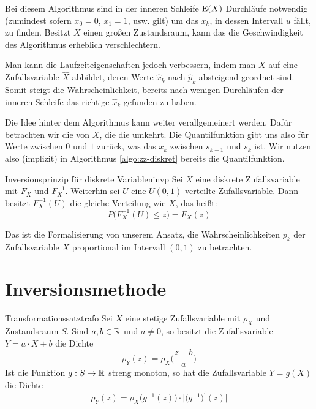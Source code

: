 Bei diesem Algorithmus sind in der inneren Schleife $\operatorname{E}(X)$ Durchläufe
notwendig (zumindest sofern $x_0 = 0$, $x_1=1$, usw. gilt)
um das $x_k$, in dessen Intervall $u$ fällt, zu finden.
Besitzt $X$ einen großen Zustandsraum, kann das die Geschwindigkeit des
Algorithmus erheblich verschlechtern.

Man kann die Laufzeiteigenschaften jedoch
verbessern, indem man $X$ auf eine Zufallsvariable $\hat{X}$ abbildet, deren
Werte $\hat{x}_k$ nach $\hat{p}_k$ absteigend geordnet sind. Somit steigt die
Wahrscheinlichkeit, bereits nach wenigen Durchläufen der inneren Schleife das
richtige $\hat{x}_k$ gefunden zu haben.

Die Idee hinter dem Algorithmus kann weiter verallgemeinert werden. Dafür
betrachten wir die  von $X$, die die
 umkehrt. Die Quantilfunktion gibt
uns also für Werte zwischen $0$ und $1$ zurück, was das $x_k$ zwischen $s_{k-1}$
und $s_k$ ist. Wir nutzen also (implizit) in Algorithmus \ref{algo:zz-diskret}
bereits die Quantilfunktion.

\begin{theorem}{Inversionsprinzip für diskrete Variablen}{invp}
Sei $X$ eine diskrete Zufallsvariable mit 
$F_X$ und 
$F_X^{-1}$. Weiterhin sei $U$ eine $U(0,1)$-verteilte Zufallsvariable. Dann
besitzt $F_X^{-1}(U)$ die gleiche Verteilung wie $X$, das heißt:
\[
P\big(F_X^{-1}(U)\le z\big) = F_X(z)
\]
\end{theorem}
Das ist die Formalisierung von unserem Ansatz, die Wahrscheinlichkeiten $p_k$
der Zufallsvariable $X$ proportional im Intervall $(0,1)$ zu betrachten.

\section{Inversionsmethode}

\begin{theorem}{Transformationssatz}{trafo}
Sei $X$ eine stetige Zufallsvariable mit  $\rho_X$ und
Zustandsraum $S$. Sind $a,b\in\mathbb{R}$ und $a \ne 0$, so besitzt die Zufallsvariable
$Y = a\cdot X + b$ die Dichte
\[
\rho_Y(z) = \rho_X\Big(\frac{z-b}{a}\Big)
\]
Ist die Funktion $g:S\to\mathbb{R}$ streng monoton, so hat die Zufallsvariable $Y=g(X)$
die Dichte
\[
\rho_Y(z) = \rho_X\big(g^{-1}(z)\big)\cdot\big|\big(g^{-1}\big)^\prime(z)\big|
\]
\end{theorem}

